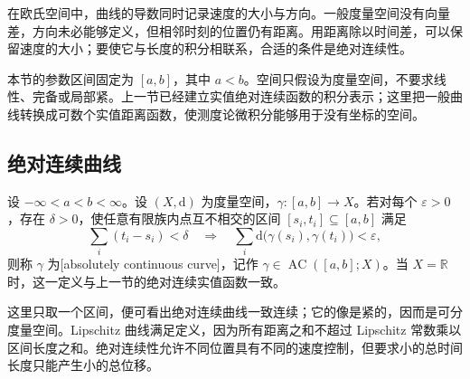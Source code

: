 
在欧氏空间中，曲线的导数同时记录速度的大小与方向。一般度量空间没有向量差，方向未必能够定义，但相邻时刻的位置仍有距离。用距离除以时间差，可以保留速度的大小；要使它与长度的积分相联系，合适的条件是绝对连续性。

\ProseParagraphBreak

本节的参数区间固定为 \([a,b]\)，其中 \(a<b\)。空间只假设为度量空间，不要求线性、完备或局部紧。上一节已经建立实值绝对连续函数的积分表示；这里把一般曲线转换成可数个实值距离函数，使测度论微积分能够用于没有坐标的空间。


\subsection{绝对连续曲线}
\label{b1:subsec:160501}

\begin{definition}
\label{b1:def:absolutely-continuous-curve}
设 \(-\infty<a<b<\infty\)。设 \((X,\mathrm{d})\) 为度量空间，\(\gamma:[a,b]\to X\)。若对每个 \(\varepsilon>0\)，存在 \(\delta>0\)，使任意有限族内点互不相交的区间 \([s_i,t_i]\subseteq[a,b]\) 满足
\[
\sum_i(t_i-s_i)<\delta
\quad\Longrightarrow\quad
\sum_i \mathrm{d}\bigl(\gamma(s_i),\gamma(t_i)\bigr)<\varepsilon,
\]
则称 \(\gamma\) 为[absolutely continuous curve]，记作 \(\gamma\in\operatorname{AC}([a,b];X)\)。当 \(X=\mathbb R\) 时，这一定义与上一节的绝对连续实值函数一致。
\end{definition}

这里只取一个区间，便可看出绝对连续曲线一致连续；它的像是紧的，因而是可分度量空间。Lipschitz 曲线满足定义，因为所有距离之和不超过 Lipschitz 常数乘以区间长度之和。绝对连续性允许不同位置具有不同的速度控制，但要求小的总时间长度只能产生小的总位移。

